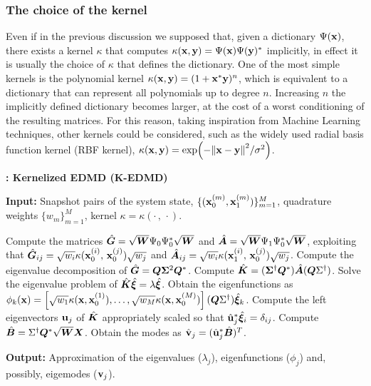 \subsubsection{The choice of the kernel}
Even if in the previous discussion we supposed that, given a dictionary $\Psi(\vb{x})$, there exists a kernel $\kappa$ that computes $\kappa(\vb{x}, \vb{y}) = \Psi(\vb{x})\Psi(\vb{y})^*$ implicitly, in effect it is usually the choice of $\kappa$ that defines the dictionary. One of the most simple kernels is the polynomial kernel $\kappa(\vb{x}, \vb{y}) = (1 + \vb{x}^*\vb{y})^{n}$, which is equivalent to a dictionary that can represent all polynomials up to degree $n$. Increasing $n$ the implicitly defined dictionary becomes larger, at the cost of a worst conditioning of the resulting matrices. For this reason, taking inspiration from Machine Learning techniques, other kernels could be considered, such as the widely used radial basis function kernel (RBF kernel), $\kappa(\vb{x}, \vb{y}) = \exp(-\norm{\vb{x}-\vb{y}}^2 / \sigma^2)$.

\begin{algorithm}[h]
\caption{\textbf{: Kernelized EDMD (K-EDMD)}}
\label{alg_kedmd}
\textbf{Input:} Snapshot pairs of the system state, $\{(\vb{x}_0^{(m)}, \vb{x}_1^{(m)})\}_{m = 1}^M$, quadrature weights $\{w_m\}_{m = 1}^M$, kernel $\kappa = \kappa(\cdot\,,\,\cdot)$.
\begin{algorithmic}[1]
\State  Compute the matrices $\hat{\vb*{G}} = \sqrt{\vb*{W}}\Psi_0\Psi_0^*\sqrt{\vb*{W}}$ and  $\hat{\vb*{A}} = \sqrt{\vb*{W}}\Psi_1\Psi_0^*\sqrt{\vb*{W}}$, exploiting that $\hat{\vb*{G}}_{ij} = \sqrt{w_i} \kappa(\vb{x}_0^{(i)},\, \vb{x}_0^{(j)}) \sqrt{w_j}$ and
$\hat{\vb*{A}}_{ij} = \sqrt{w_i} \kappa(\vb{x}_1^{(i)},\, \vb{x}_0^{(j)}) \sqrt{w_j}$.
\State Compute the eigenvalue decomposition of $\hat{\vb*{G}} = \vb*{Q}\vb*{\Sigma}^2\vb*{Q}^*$.
\State Compute $\hat{\vb*{K}} = (\vb*{\Sigma}^{\dagger}\vb*{Q}^*)\hat{\vb*{A}} (\vb*{Q}\Sigma^{\dagger})$.
\State Solve the eigenvalue problem of $\hat{\vb*{K}}\hat{\bm{\xi}} = \lambda \hat{\bm{\xi}}$.
\State Obtain the eigenfunctions as $\phi_k(\vb{x}) = \left[\sqrt{w_1} \kappa(\vb{x}, \vb{x}_0^{(1)}), \dots, \sqrt{w_M} \kappa(\vb{x}, \vb{x}_0^{(M)})\right](\vb*{Q}\Sigma^{\dagger}) \hat{\bm{\xi}}_k$.
    \State Compute the left eigenvectors $\vb{u}_j$ of $\hat{\vb*{K}}$ appropriately scaled so that $\hat{\vb{u}}_j^*\hat{\bm{\xi}}_i = \delta_{ij}$.
    \State Compute $\hat{\vb*{B}} = \Sigma^{\dagger} \vb*{Q}^* \sqrt{\vb*{W}} \vb*{X}$.
    \State Obtain the modes as $\hat{\vb{v}}_j = (\hat{\vb{u}}_j^* \hat{\vb*{B}})^T$.
\EndIf
\end{algorithmic}
\textbf{Output:} Approximation of the eigenvalues ($\lambda_j$), eigenfunctions ($\phi_j$) and, possibly, eigemodes ($\vb{v}_j$).
\end{algorithm}

